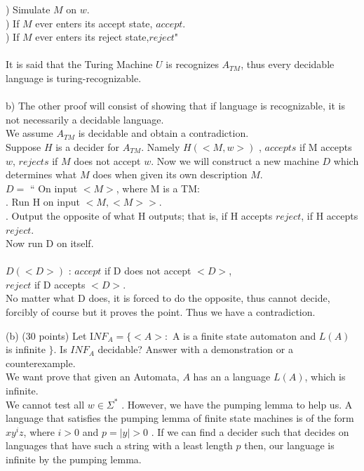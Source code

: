 \documentclass{report}
\newcommand{\me}[1]{
\begin{math}
#1
\end{math}
}
\begin{document}
   ) Simulate $M$ on $w$.\\
   ) If $M$ ever enters its accept state, $accept$. \\
   ) If $M$ ever enters its reject state,$reject$" \\ \\
    It is said that the Turing Machine $U$ is recognizes $A_{TM}$, thus every decidable language is turing-recognizable. \\ \\
b) The other proof will consist of showing that if language is recognizable, it is not necessarily a decidable language. \\ 
\indent We assume $A_{TM}$ is decidable and obtain a contradiction. \\ 
Suppose $H$ is a decider for $A_{TM}$. Namely \me{H(<M,w>)}, $accepts$ if M accepts $w$, $rejects$ if $M$ does not accept $w$. Now we will construct a new machine $D$ which determines what $M$ does when given its own description $M$. \\
\indent \me{D =} `` On input $<M>$, where M is a TM: \\
\indent {}. Run H on input $<M,<M>>$. \\
\indent {}. Output the opposite of what H outputs; that is, if H accepts $reject$, \indent \indent  if H accepts $reject$.\\ Now run D on itself. \\ \\

\me{D(<D>)}: $accept$ if D does not accept $<D>$, \\ \indent \indent \indent \indent \indent$reject$ if D accepts $<D>$. \\
No matter what D does, it is forced to do the opposite, thus cannot decide, forcibly of course but it proves the point. Thus we have a contradiction. 

\newpage

(b) (30 points)  Let I$NF_A =  \{<A>: $ A is a finite state automaton and \me{L(A)} is infinite $\} $. Is $INF_A$ decidable? Answer with a demonstration or a counterexample. \\


We want prove that given  an Automata, $A$ has an a language $L(A)$, which is infinite. \\ We cannot test all \me{w \in \Sigma^*}. However, we have the pumping lemma to help us. A language that satisfies the pumping lemma of finite state machines is of the form $xy^iz$, where \me{i >0} and \me{p=|y|>0}. If we can find a decider such that decides on languages that have such a string with a least length $p$ then, our language is infinite by the pumping lemma. \\ \\
 
\end{document}
